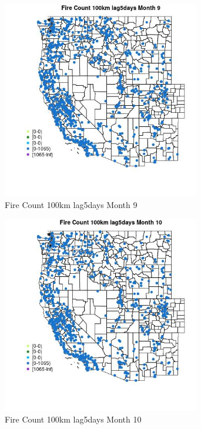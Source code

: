 \begin{figure} 
\centering  
\includegraphics[width=0.77\textwidth]{Code_Outputs/Report_ML_input_PM25_Step4_part_f_de_duplicated_aves_prioritize_24hr_obswNAs_MapObsMo9Fire_Count_100km_lag5days.jpg} 
\caption{\label{fig:Report_ML_input_PM25_Step4_part_f_de_duplicated_aves_prioritize_24hr_obswNAsMapObsMo9Fire_Count_100km_lag5days}Fire Count 100km lag5days Month 9} 
\end{figure} 
 

\begin{figure} 
\centering  
\includegraphics[width=0.77\textwidth]{Code_Outputs/Report_ML_input_PM25_Step4_part_f_de_duplicated_aves_prioritize_24hr_obswNAs_MapObsMo10Fire_Count_100km_lag5days.jpg} 
\caption{\label{fig:Report_ML_input_PM25_Step4_part_f_de_duplicated_aves_prioritize_24hr_obswNAsMapObsMo10Fire_Count_100km_lag5days}Fire Count 100km lag5days Month 10} 
\end{figure} 
 


